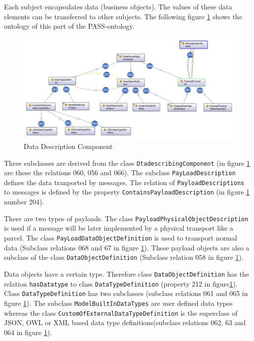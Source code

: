 Each subject encapsulates data (business objects). The values of these data elements can be transferred to other subjects. The following figure \ref{fig:20181218-data} shows the ontology of this part of the PASS-ontology.

\begin{figure}[htbp]
	\centering
	\includegraphics[width=0.9\linewidth]{Figures/Ontology/SubjectInteraction/20181218-Data}
	\caption[Data Description Component]{Data Description Component}
	\label{fig:20181218-data}
\end{figure}

Three subclasses are derived from the class \texttt{DtadescribingComponent} (in figure \ref{fig:20181218-data} are these the relations 060, 056 and 066). The subclass \texttt{PayLoadDescription} defines the data tranported by messages. The relation of \texttt{PayloadDescriptions} to messages is defined by the property \texttt{ContainsPayloadDescription} (in figure \ref{fig:20181218-data} number 204).

There are two types of payloads. The class \texttt{PayloadPhysicalObjectDescription} is used if a message will be later implemented by a physical transport like a parcel. The class \texttt{PayLoadDataObjectDefinition} is used to transport normal data (Subclass relations 068 and 67 in figure \ref{fig:20181218-data}). These payload objects are also a subclass of the class \texttt{DataObjectDefinition} (Subclass relation 058 in figure \ref{fig:20181218-data}).

Data objects have a certain type. Therefore class \texttt{DataObjectDefinition} has the relation \texttt{hasDatatype} to class \texttt{DataTypeDefinition} (property 212 in figure\ref{fig:20181218-data}). Class \texttt{DataTypeDefinition} has two subclasses (subclass relations 061 and 065 in figure \ref{fig:20181218-data}). The subclass \texttt{ModelBuiltInDataTypes} are user defined data types whereas the class \texttt{CustomOfExternalDataTypeDefinition} is the superclass of JSON, OWL or XML based data type definitions(subclass relations 062, 63 and 064 in figure \ref{fig:20181218-data}).

